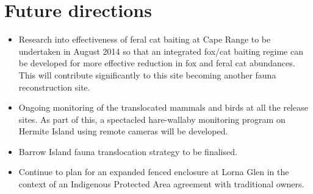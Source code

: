 \documentclass[version=last, paper=a4, DIV=18, usenames, dvipsnames]{scrartcl}
\begin{document}
\section*{Future directions}
\begin{itemize}
\itemsep1pt\parskip0pt
\item
  Research into effectiveness of feral cat baiting at Cape Range to be
  undertaken in August 2014 so that an integrated fox/cat baiting regime
  can be developed for more effective reduction in fox and feral cat
  abundances. This will contribute significantly to this site becoming
  another fauna reconstruction site.
\item
  Ongoing monitoring of the translocated mammals and birds at all the
  release sites. As part of this, a spectacled hare-wallaby monitoring
  program on Hermite Island using remote cameras will be developed.
\item
  Barrow Island fauna translocation strategy to be finalised.
\item
  Continue to plan for an expanded fenced enclosure at Lorna Glen in the
  context of an Indigenous Protected Area agreement with traditional
  owners.
\end{itemize}




\clearpage
\end{document}
